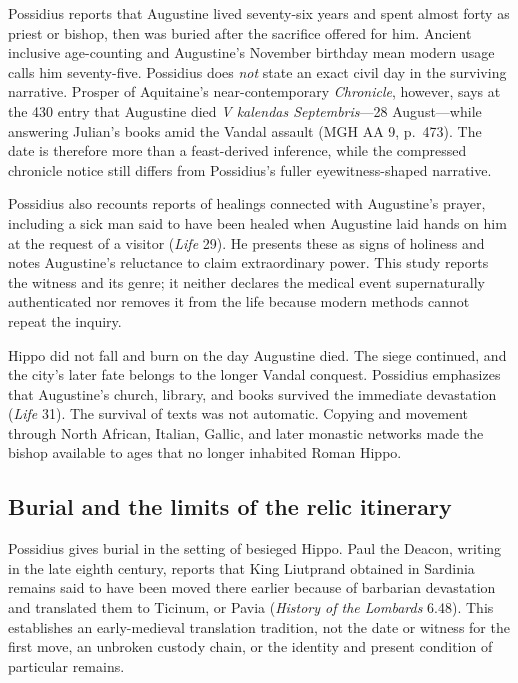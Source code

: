 Possidius reports that Augustine lived seventy-six years and spent almost
forty as priest or bishop, then was buried after the sacrifice offered for him.
Ancient inclusive age-counting and Augustine's November birthday mean modern
usage calls him seventy-five. Possidius does \emph{not} state an exact civil
day in the surviving narrative. Prosper of Aquitaine's near-contemporary
\emph{Chronicle}, however, says at the 430 entry that Augustine died
\emph{V kalendas Septembris}---28 August---while answering Julian's books amid
the Vandal assault (MGH AA 9, p.~473). The date is therefore more than a
feast-derived inference, while the compressed chronicle notice still differs
from Possidius's fuller eyewitness-shaped narrative.

Possidius also recounts reports of healings connected with Augustine's prayer,
including a sick man said to have been healed when Augustine laid hands on him
at the request of a visitor (\emph{Life} 29). He presents these as signs of
holiness and notes Augustine's reluctance to claim extraordinary power. This
study reports the witness and its genre; it neither declares the medical event
supernaturally authenticated nor removes it from the life because modern
methods cannot repeat the inquiry.

Hippo did not fall and burn on the day Augustine died. The siege continued,
and the city's later fate belongs to the longer Vandal conquest. Possidius
emphasizes that Augustine's church, library, and books survived the immediate
devastation (\emph{Life} 31). The survival of texts was not automatic. Copying
and movement through North African, Italian, Gallic, and later monastic
networks made the bishop available to ages that no longer inhabited Roman
Hippo.

\subsection{Burial and the limits of the relic itinerary}

Possidius gives burial in the setting of besieged Hippo. Paul the Deacon,
writing in the late eighth century, reports that King Liutprand obtained in
Sardinia remains said to have been moved there earlier because of barbarian
devastation and translated them to Ticinum, or Pavia
(\emph{History of the Lombards} 6.48). This establishes an early-medieval
translation tradition, not the date or witness for the first move, an unbroken
custody chain, or the identity and present condition of particular remains.


